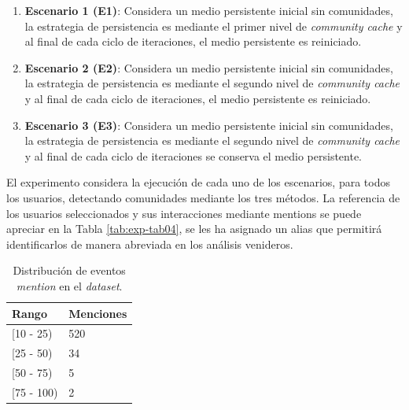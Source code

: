 \begin{enumerate}
	\item \textbf{Escenario 1 (E1)}: Considera un medio persistente inicial sin comunidades, la estrategia de persistencia es mediante el primer nivel de \textit{community cache} y al final de cada ciclo de iteraciones, el medio persistente es reiniciado.
	\item \textbf{Escenario 2 (E2)}: Considera un medio persistente inicial sin comunidades, la estrategia de persistencia es mediante el segundo nivel de \textit{community cache} y al final de cada ciclo de iteraciones, el medio persistente es reiniciado.
	\item \textbf{Escenario 3 (E3)}: Considera un medio persistente inicial sin comunidades, la estrategia de persistencia es mediante el segundo nivel de \textit{community cache} y al final de cada ciclo de iteraciones se conserva el medio persistente.
\end{enumerate}

El experimento considera la ejecución de cada uno de los escenarios, para todos los usuarios, detectando comunidades mediante los tres métodos. La referencia de los usuarios seleccionados y sus interacciones mediante mentions se puede apreciar en la Tabla \ref{tab:exp-tab04}, se les ha asignado un alias que permitirá identificarlos de manera abreviada en los análisis venideros.

\begin{table}[H]
  \begin{center}
    \caption{Distribución de eventos \textit{mention} en el \textit{dataset}.}
    \label{tab:exp-tab03}
      \begin{tabular}{|L{4cm}|L{4cm}|}
        \hline
        \textbf{Rango} & \textbf{Menciones}\\ \hline
         [10 - 25) & 520\\ \hline
         [25 - 50) & 34\\ \hline
         [50 - 75) & 5\\ \hline
         [75 - 100) & 2\\ \hline
      \end{tabular}
  \end{center}
\end{table}

